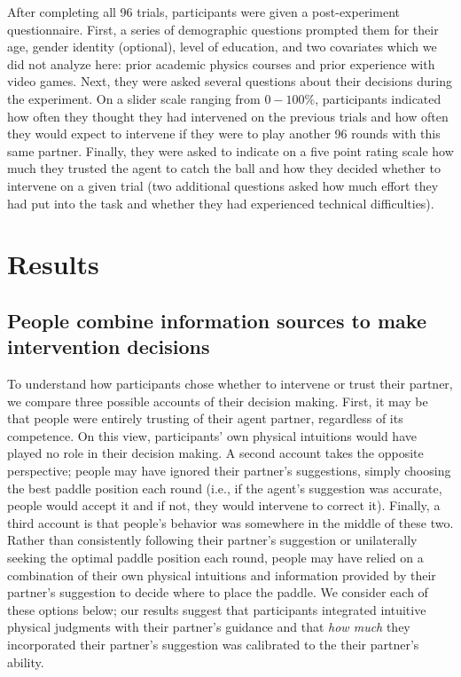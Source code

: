 \documentclass[10pt,letterpaper]{article}
\begin{document}
After completing all 96 trials, participants were given a post-experiment questionnaire. First, a series of demographic questions prompted them for their age, gender identity (optional), level of education, and two covariates which we did not analyze here: prior academic physics courses and prior experience with video games. Next, they were asked several questions about their decisions during the experiment. On a slider scale ranging from $0-100\%$, participants indicated how often they thought they had intervened on the previous trials and how often they would expect to intervene if they were to play another 96 rounds with this same partner. Finally, they were asked to indicate on a five point rating scale how much they trusted the agent to catch the ball and how they decided whether to intervene on a given trial (two additional questions asked how much effort they had put into the task and whether they had experienced technical difficulties).



\section{Results}

\subsection{People combine information sources to make intervention decisions}

To understand how participants chose whether to intervene or trust their partner, we compare three possible accounts of their decision making. First, it may be that people were entirely trusting of their agent partner, regardless of its competence. On this view, participants' own physical intuitions would have played no role in their decision making. A second account takes the opposite perspective; people may have ignored their partner's suggestions, simply choosing the best paddle position each round (i.e., if the agent's suggestion was accurate, people would accept it and if not, they would intervene to correct it). Finally, a third account is that people's behavior was somewhere in the middle of these two. Rather than consistently following their partner's suggestion or unilaterally seeking the optimal paddle position each round, people may have relied on a combination of their own physical intuitions and information provided by their partner's suggestion to decide where to place the paddle. We consider each of these options below; our results suggest that participants integrated intuitive physical judgments with their partner's guidance and that \textit{how much} they incorporated their partner's suggestion was calibrated to the their partner's ability.
\end{document}

